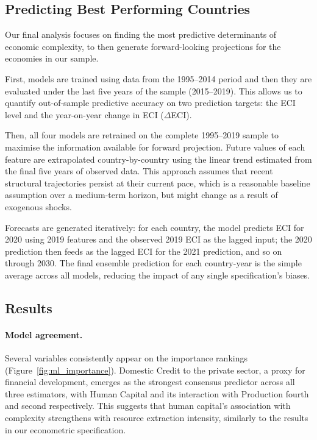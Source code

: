 \documentclass[12pt,a4paper]{report}
\begin{document}
\subsection{Predicting Best Performing Countries}

Our final analysis focuses on finding the most predictive determinants of economic complexity, to then generate forward-looking projections for the economies in our sample.

First, models are trained using data from the 1995--2014 period and then they are evaluated under the last five years of the sample (2015--2019). This allows us to quantify out-of-sample predictive accuracy on two prediction targets: the ECI level and the year-on-year change in ECI ($\Delta$ECI).

Then, all four models are retrained on the complete 1995--2019 sample to maximise the information available for forward projection. Future values of each feature are extrapolated country-by-country using the linear trend estimated from the final five years of observed data. This approach assumes that recent structural trajectories persist at their current pace, which is a reasonable baseline assumption over a medium-term horizon, but might change as a result of exogenous shocks.

Forecasts are generated iteratively: for each country, the model predicts ECI for 2020 using 2019 features and the observed 2019 ECI as the lagged input; the 2020 prediction then feeds as the lagged ECI for the 2021 prediction, and so on through 2030. The final ensemble prediction for each country-year is the simple average across all models, reducing the impact of any single specification's biases.

\subsection{Results}

\paragraph{Model agreement.}
Several variables consistently appear on the importance rankings (Figure~\ref{fig:ml_importance}). Domestic Credit to the private sector, a proxy for financial development, emerges as the strongest consensus predictor across all three estimators, with Human Capital and its interaction with Production fourth and second respectively. This suggests that human capital's association with complexity strengthens with resource extraction intensity, similarly to the results in our econometric specification.
\end{document}
